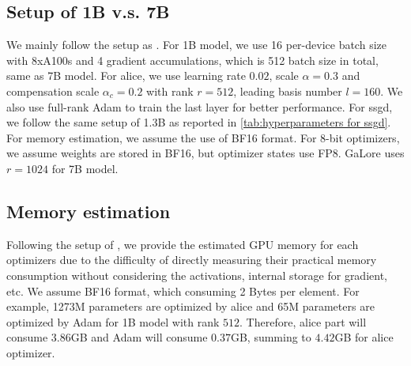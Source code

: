 \begin{table}[]
\centering
\caption{The hyperparmeters for \gls{alice} optimizer}
\label{tab: alice hyperparameters}
\end{table}

\subsection{Setup of 1B v.s. 7B}
\label{subapp: setup 1B vs 7B}
We mainly follow the setup as \citet{zhu2024apollo}. For 1B model, we use 16 per-device batch size with 8xA100s and 4 gradient accumulations, which is 512 batch size in total, same as 7B model. For \gls{alice}, we use learning rate $0.02$, scale $\alpha=0.3$ and compensation scale $\alpha_c=0.2$ with rank $r=512$, leading basis number $l=160$. We also use full-rank Adam to train the last layer for better performance. For \gls{ssgd}, we follow the same setup of 1.3B as reported in \cref{tab:hyperparameters for ssgd}.
For memory estimation, we assume the use of BF16 format. 
For 8-bit optimizers, we assume weights are stored in BF16, but optimizer states use FP8. GaLore uses $r=1024$ for 7B model. 

\subsection{Memory estimation}
Following the setup of \cite{zhao2024galore}, we provide the estimated GPU memory for each optimizers due to the difficulty of directly measuring their practical memory consumption without considering the activations, internal storage for gradient, etc. We assume BF16 format, which consuming 2 Bytes per element. For example, 1273M parameters are optimized by \gls{alice} and 65M parameters are optimized by Adam for 1B model with rank $512$. Therefore, \gls{alice} part will consume $3.86$GB and Adam will consume $0.37$GB, summing to $4.42$GB for \gls{alice} optimizer.

